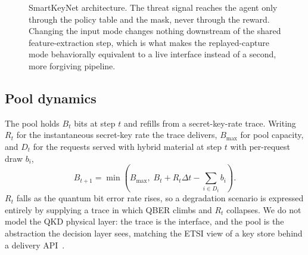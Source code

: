 \documentclass[conference]{IEEEtran}
\begin{document}
\begin{figure}[t]
\caption{SmartKeyNet architecture. The threat signal reaches the agent only through the policy table and the mask, never through the reward. Changing the input mode changes nothing downstream of the shared feature-extraction step, which is what makes the replayed-capture mode behaviorally equivalent to a live interface instead of a second, more forgiving pipeline.}
\label{fig:architecture}
\end{figure}

\subsection{Pool dynamics}

The pool holds $B_t$ bits at step $t$ and refills from a secret-key-rate trace. Writing $R_t$ for the instantaneous secret-key rate the
trace delivers, $B_{\max}$ for pool capacity, and $D_t$ for the requests
served with hybrid material at step $t$ with per-request draw $b_i$,
\begin{equation}
B_{t+1} = \min\!\left( B_{\max},\; B_t + R_t \Delta t - \sum_{i \in D_t} b_i \right).
\label{eq:pool}
\end{equation}
$R_t$ falls as the quantum bit error rate rises, so a degradation
scenario is expressed entirely by supplying a trace in which
QBER climbs and $R_t$ collapses. We do not model the QKD
physical layer: the trace is the interface, and the pool is the
abstraction the decision layer sees, matching the ETSI view
of a key store behind a delivery API~\cite{ref6}.
\end{document}
